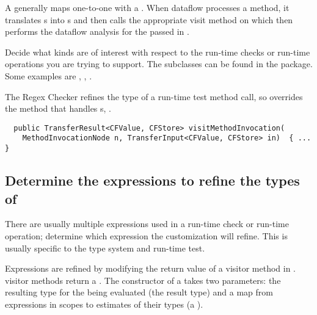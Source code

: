 A  generally maps one-to-one with a
. When dataflow processes a method, it translates
s into s and then
calls the appropriate visit method on
 which then performs the dataflow
analysis for the passed in .

Decide what  kinds are of interest with
respect to the run-time checks or run-time operations you are trying to support.
The  subclasses can be found in the
 package.  Some examples are
,
,
.

The Regex Checker refines the type of a run-time test method call, so
 overrides the method that handles
s,
.

\begin{smaller}
\begin{Verbatim}
  public TransferResult<CFValue, CFStore> visitMethodInvocation(
    MethodInvocationNode n, TransferInput<CFValue, CFStore> in)  { ... }
\end{Verbatim}
\end{smaller}

\subsection{Determine the expressions to refine the types
of\label{dataflow-determine-expressions}}

There are usually multiple expressions used in a run-time check or run-time
operation; determine which expression the customization will refine.  This is
usually specific to the type system and run-time test.

\begin{sloppypar}
Expressions are refined by modifying the return value of a visitor method in
.
 visitor methods return a
.  The constructor of a
 takes two parameters: the resulting
type for the  being evaluated (the result
type) and a map from expressions in scopes to estimates of their types (a
).
\end{sloppypar}

